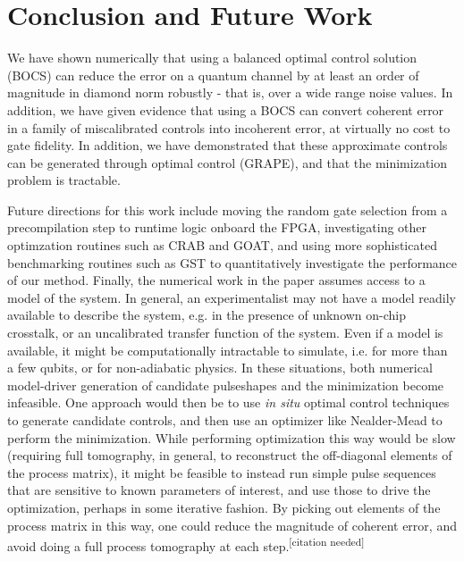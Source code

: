 \documentclass[aps,nofootinbib,pra,notitlepage,twocolumn]{revtex4-1}
\newcommand{\needcite}{{\color{blue}\textsuperscript{[citation needed]}}}
\begin{document}
\section{Conclusion and Future Work}
We have shown numerically that using a balanced optimal control solution (BOCS) can reduce the error on a quantum channel by at least an order of magnitude in diamond norm robustly - that is, over a wide range noise values. In addition, we have given evidence that using a BOCS can convert coherent error in a family of miscalibrated controls into incoherent error, at virtually no cost to gate fidelity. In addition, we have demonstrated that these approximate controls can be generated through optimal control (GRAPE), and that the minimization problem is tractable. 


Future directions for this work include moving the random gate selection from a precompilation step to runtime logic onboard the FPGA, investigating other optimzation routines such as CRAB \cite{Caneva2011} and GOAT\cite{Machnes2018}, and using more sophisticated benchmarking routines such as GST\cite{BlumeKohout2017} to quantitatively investigate the performance of our method. Finally, the numerical work in the paper assumes access to a model of the system. In general, an experimentalist may not have a model readily available to describe the system, e.g. in the presence of unknown on-chip crosstalk, or an uncalibrated transfer function of the system. Even if a model is available, it might be computationally intractable to simulate, i.e. for more than a few qubits, or for non-adiabatic physics. In these situations, both numerical model-driver generation of candidate pulseshapes and the minimization become infeasible. One approach would then be to use \textit{in situ} optimal control techniques \cite{Wu2018, Kelly2014, Ferrie2015} to generate candidate controls, and then use an optimizer like Nealder-Mead to perform the minimization. While performing optimization this way would be slow (requiring full tomography, in general, to reconstruct the off-diagonal elements of the process matrix), it might be feasible to instead run simple pulse sequences that are sensitive to known parameters of interest, and use those to drive the optimization, perhaps in some iterative fashion. By picking out elements of the process matrix in this way, one could reduce the magnitude of coherent error, and avoid doing a full process tomography at each step.\needcite 
\end{document}
